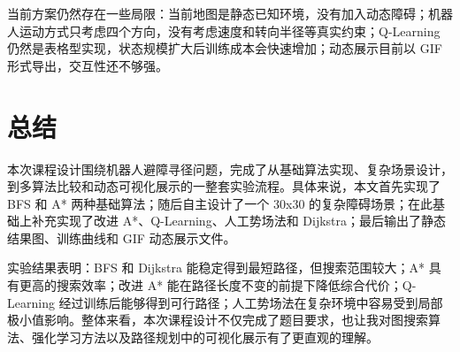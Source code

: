 \documentclass[12pt,a4paper,fontset=none]{ctexart}
\begin{document}
当前方案仍然存在一些局限：当前地图是静态已知环境，没有加入动态障碍；机器人运动方式只考虑四个方向，没有考虑速度和转向半径等真实约束；Q-Learning 仍然是表格型实现，状态规模扩大后训练成本会快速增加；动态展示目前以 GIF 形式导出，交互性还不够强。

\section{总结}

本次课程设计围绕机器人避障寻径问题，完成了从基础算法实现、复杂场景设计，到多算法比较和动态可视化展示的一整套实验流程。具体来说，本文首先实现了 BFS 和 A* 两种基础算法；随后自主设计了一个 30x30 的复杂障碍场景；在此基础上补充实现了改进 A*、Q-Learning、人工势场法和 Dijkstra；最后输出了静态结果图、训练曲线和 GIF 动态展示文件。

实验结果表明：BFS 和 Dijkstra 能稳定得到最短路径，但搜索范围较大；A* 具有更高的搜索效率；改进 A* 能在路径长度不变的前提下降低综合代价；Q-Learning 经过训练后能够得到可行路径；人工势场法在复杂环境中容易受到局部极小值影响。整体来看，本次课程设计不仅完成了题目要求，也让我对图搜索算法、强化学习方法以及路径规划中的可视化展示有了更直观的理解。
\end{document}
